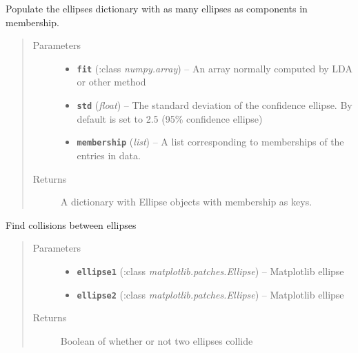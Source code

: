 \documentclass[letterpaper,10pt,english]{sphinxmanual}
\begin{document}

\begin{fulllineitems}
\label{Doc:Moduler.getEllipses}
Populate the ellipses dictionary with as many ellipses as components in membership.
\begin{quote}\begin{description}
\item[{Parameters}] \leavevmode\begin{itemize}
\item {} 
\textbf{\texttt{fit}} (:class \emph{numpy.array}) -- An array normally computed by LDA or other method

\item {} 
\textbf{\texttt{std}} (\emph{float}) -- The standard deviation of the confidence ellipse. By default is set to 2.5 (95\% confidence ellipse)

\item {} 
\textbf{\texttt{membership}} (\emph{list}) -- A list corresponding to memberships of the entries in data.

\end{itemize}

\item[{Returns}] \leavevmode
A dictionary with Ellipse objects with membership as keys.

\end{description}\end{quote}

\end{fulllineitems}


\begin{fulllineitems}
\label{Doc:Moduler.EllipseOverlap}
Find collisions between ellipses
\begin{quote}\begin{description}
\item[{Parameters}] \leavevmode\begin{itemize}
\item {} 
\textbf{\texttt{ellipse1}} (:class \emph{matplotlib.patches.Ellipse}) -- Matplotlib ellipse

\item {} 
\textbf{\texttt{ellipse2}} (:class \emph{matplotlib.patches.Ellipse}) -- Matplotlib ellipse

\end{itemize}

\item[{Returns}] \leavevmode
Boolean of whether or not two ellipses collide

\end{description}\end{quote}

\end{fulllineitems}
\end{document}
